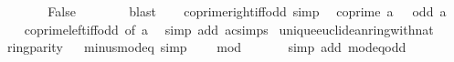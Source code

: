 \begin{isabellebody}
\ \ \ \ \isamarkupfalse%
\ \isamarkupfalse%
\ False\isanewline
\ \ \ \ \ \ \isamarkupfalse%
\ blast\isanewline
\ \ \isamarkupfalse%
\isanewline
{}\isamarkupfalse%
%
\endisatagproof
{\isafoldproof}%
%
\isadelimproof
\isanewline
%
\endisadelimproof
\isanewline
{}\isamarkupfalse%
\ coprime{\isacharunderscore}{\kern0pt}right{\isacharunderscore}{\kern0pt}{}{\isacharunderscore}{\kern0pt}iff{\isacharunderscore}{\kern0pt}odd\ {\isacharbrackleft}{\kern0pt}simp{\isacharbrackright}{\kern0pt}{\isacharcolon}{\kern0pt}\isanewline
\ \ {\isachardoublequoteopen}coprime\ a\ {}\ {\isasymlongleftrightarrow}\ odd\ a{\isachardoublequoteclose}\isanewline
%
\isadelimproof
\ \ %
\endisadelimproof
%
\isatagproof
{}\isamarkupfalse%
\ coprime{\isacharunderscore}{\kern0pt}left{\isacharunderscore}{\kern0pt}{}{\isacharunderscore}{\kern0pt}iff{\isacharunderscore}{\kern0pt}odd\ {\isacharbrackleft}{\kern0pt}of\ a{\isacharbrackright}{\kern0pt}\ \isamarkupfalse%
\ {\isacharparenleft}{\kern0pt}simp\ add{\isacharcolon}{\kern0pt}\ ac{\isacharunderscore}{\kern0pt}simps{\isacharparenright}{\kern0pt}%
\endisatagproof
{\isafoldproof}%
%
\isadelimproof
\isanewline
%
\endisadelimproof
\isanewline
{}\isamarkupfalse%
\isanewline
\isanewline
{}\isamarkupfalse%
\ unique{\isacharunderscore}{\kern0pt}euclidean{\isacharunderscore}{\kern0pt}ring{\isacharunderscore}{\kern0pt}with{\isacharunderscore}{\kern0pt}nat\isanewline
{}\isanewline
\isanewline
{}\isamarkupfalse%
\ ring{\isacharunderscore}{\kern0pt}parity%
\isadelimproof
\ %
\endisadelimproof
%
\isatagproof
\isacommand{{\isachardot}{\kern0pt}{\isachardot}{\kern0pt}}\isamarkupfalse%
%
\endisatagproof
{\isafoldproof}%
%
\isadelimproof
%
\endisadelimproof
\isanewline
\isanewline
{}\isamarkupfalse%
\ minus{\isacharunderscore}{\kern0pt}{}{\isacharunderscore}{\kern0pt}mod{\isacharunderscore}{\kern0pt}{}{\isacharunderscore}{\kern0pt}eq\ {\isacharbrackleft}{\kern0pt}simp{\isacharbrackright}{\kern0pt}{\isacharcolon}{\kern0pt}\isanewline
\ \ {\isachardoublequoteopen}{\isacharminus}{\kern0pt}\ {}\ mod\ {}\ {\isacharequal}{\kern0pt}\ {}{\isachardoublequoteclose}\isanewline
%
\isadelimproof
\ \ %
\endisadelimproof
%
\isatagproof
{}\isamarkupfalse%
\ {\isacharparenleft}{\kern0pt}simp\ add{\isacharcolon}{\kern0pt}\ mod{\isacharunderscore}{\kern0pt}{}{\isacharunderscore}{\kern0pt}eq{\isacharunderscore}{\kern0pt}odd{\isacharparenright}{\kern0pt}%

\end{isabellebody}

